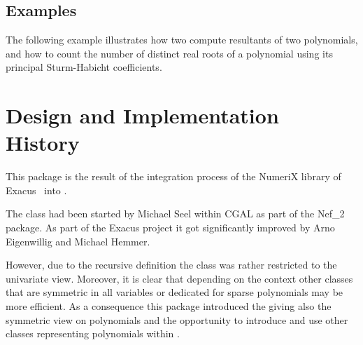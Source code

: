 \subsection{Examples}

The following example illustrates how two compute resultants of two
polynomials, and how to count the number of distinct real roots
of a polynomial using its principal Sturm-Habicht coefficients.


\section{Design and Implementation History}

This package is the result of the integration process of the NumeriX library 
of {\sc Exacus}~\cite{beh+-eeeafcs-05} into \cgal.

The class  had been started by Michael Seel within 
CGAL as part of the Nef\_2 package. As part of the {\sc Exacus} 
project it got significantly improved by Arno Eigenwillig and Michael Hemmer. 

However, due to the recursive definition the class was rather restricted to the 
univariate view. Moreover, it is clear that depending on the context 
other classes that are symmetric in all variables or dedicated 
for sparse polynomials may be more efficient. As a consequence this package 
introduced the  giving also
the symmetric view on polynomials and the opportunity to introduce and use
other classes representing polynomials within \cgal. 

 


 
